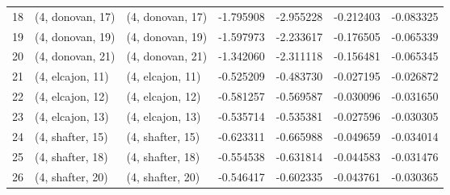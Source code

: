 \begin{tabular}{lllrrrr}
18 &  (4, donovan, 17) &  (4, donovan, 17) & -1.795908 & -2.955228 &  -0.212403 & -0.083325 \\
19 &  (4, donovan, 19) &  (4, donovan, 19) & -1.597973 & -2.233617 &  -0.176505 & -0.065339 \\
20 &  (4, donovan, 21) &  (4, donovan, 21) & -1.342060 & -2.311118 &  -0.156481 & -0.065345 \\
21 &  (4, elcajon, 11) &  (4, elcajon, 11) & -0.525209 & -0.483730 &  -0.027195 & -0.026872 \\
22 &  (4, elcajon, 12) &  (4, elcajon, 12) & -0.581257 & -0.569587 &  -0.030096 & -0.031650 \\
23 &  (4, elcajon, 13) &  (4, elcajon, 13) & -0.535714 & -0.535381 &  -0.027596 & -0.030305 \\
24 &  (4, shafter, 15) &  (4, shafter, 15) & -0.623311 & -0.665988 &  -0.049659 & -0.034014 \\
25 &  (4, shafter, 18) &  (4, shafter, 18) & -0.554538 & -0.631814 &  -0.044583 & -0.031476 \\
26 &  (4, shafter, 20) &  (4, shafter, 20) & -0.546417 & -0.602335 &  -0.043761 & -0.030365 \\
\bottomrule
\end{tabular}
